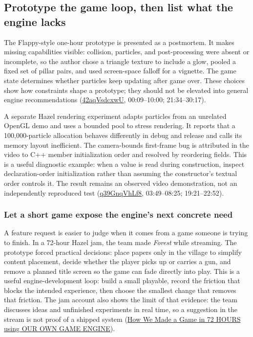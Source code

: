 \subsection{Prototype the game loop, then list what the engine lacks}\label{05-engine-i-ch013-prototype-the-game-loop-then-list-what-the-engine-lacks}

The Flappy-style one-hour prototype is presented as a postmortem. It makes missing capabilities visible: collision, particles, and post-processing were absent or incomplete, so the author chose a triangle texture to include a glow, pooled a fixed set of pillar pairs, and used screen-space falloff for a vignette. The game state determines whether particles keep updating after game over. These choices show how constraints shape a prototype; they should not be elevated into general engine recommendations (\href{https://www.youtube.com/watch?v=42aqVsdcxwU}{42aqVsdcxwU}, 00:09--10:00; 21:34--30:17).

A separate Hazel rendering experiment adapts particles from an unrelated OpenGL demo and uses a bounded pool to stress rendering. It reports that a 100,000-particle allocation behaves differently in debug and release and calls its memory layout inefficient. The camera-bounds first-frame bug is attributed in the video to C++ member initialization order and resolved by reordering fields. This is a useful diagnostic example: when a value is read during construction, inspect declaration-order initialization rather than assuming the constructor's textual order controls it. The result remains an observed video demonstration, not an independently reproduced test (\href{https://www.youtube.com/watch?v=q39GnqVhLf8}{q39GnqVhLf8}, 03:49--08:25; 19:21--22:52).

\subsubsection{Let a short game expose the engine's next concrete need}\label{05-engine-i-ch013-let-a-short-game-expose-the-engines-next-concrete-need}

A feature request is easier to judge when it comes from a game someone is trying to finish. In a 72-hour Hazel jam, the team made \emph{Forest} while streaming. The prototype forced practical decisions: place papers only in the village to simplify content placement, decide whether the player picks up or carries a gun, and remove a planned title screen so the game can fade directly into play. This is a useful engine-development loop: build a small playable, record the friction that blocks the intended experience, then choose the smallest change that removes that friction. The jam account also shows the limit of that evidence: the team discusses ideas and unfinished experiments in real time, so a suggestion in the stream is not proof of a shipped system (\href{https://www.youtube.com/watch?v=tQ_pjZDfm-0&t=0m1s}{How We Made a Game in 72 HOURS using OUR OWN GAME ENGINE}).

